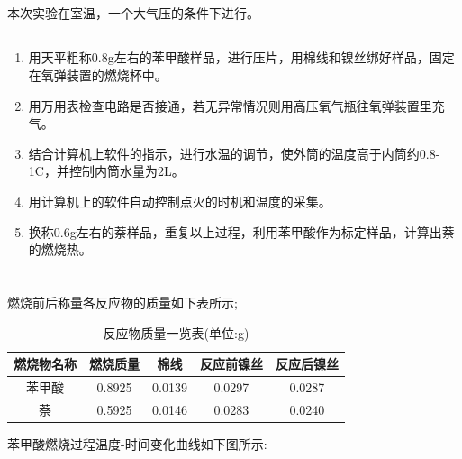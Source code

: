 ﻿\documentclass[10.5pt]{ctexart}
\begin{document}
\subsection{\textbf{}}
本次实验在室温，一个大气压的条件下进行。
\subsection{\textbf{}}
\begin{enumerate}
\item 用天平粗称0.8g左右的苯甲酸样品，进行压片，用棉线和镍丝绑好样品，固定在氧弹装置的燃烧杯中。
\item 用万用表检查电路是否接通，若无异常情况则用高压氧气瓶往氧弹装置里充气。
\item 结合计算机上软件的指示，进行水温的调节，使外筒的温度高于内筒约0.8-1\degree C，并控制内筒水量为2L。
\item 用计算机上的软件自动控制点火的时机和温度的采集。
\item 换称0.6g左右的萘样品，重复以上过程，利用苯甲酸作为标定样品，计算出萘的燃烧热。
\end{enumerate}
\section{\textbf{}}
\subsection{\textbf{}}
燃烧前后称量各反应物的质量如下表所示;
\begin{table}[!ht]
\centering
\caption{反应物质量一览表(单位:g)}
\begin{tabular}{ccccc}
\hline
燃烧物名称 & 燃烧质量& 棉线 & 反应前镍丝 & 反应后镍丝\\
\hline
苯甲酸 & 0.8925 & 0.0139 & 0.0297 & 0.0287\\
萘 & 0.5925 & 0.0146 & 0.0283 & 0.0240 \\
\hline
\end{tabular}
\end{table}
苯甲酸燃烧过程温度-时间变化曲线如下图所示:
\end{document}
